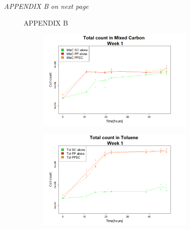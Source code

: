 \documentclass[a4paper, 10pt, conference]{ieeeconf}   %
\begin{document}
\vspace*{\fill}
\textit{APPENDIX B on next page}
\clearpage
{}
\begin{landscape}
	
	
	\begin{figure}
		APPENDIX B
		
		\flushleft
		\begin{subfigure}{.47\textheight}
			\centering
			
			\includegraphics[width=7.71cm]{totcount_mixC1.png}
			\caption{}
			
			\label{totcountmixC1}
		\end{subfigure}%
		\begin{subfigure}{.47\textheight}
			\centering
			
			\includegraphics[width=7.71cm]{totcount_tol1.png}
			\caption{}
			\label{totcounttol1}
		\end{subfigure}%
		\begin{subfigure}{.47\textheight}
			\centering
			

\end{subfigure}
\end{figure}
\end{landscape}
\end{document}
